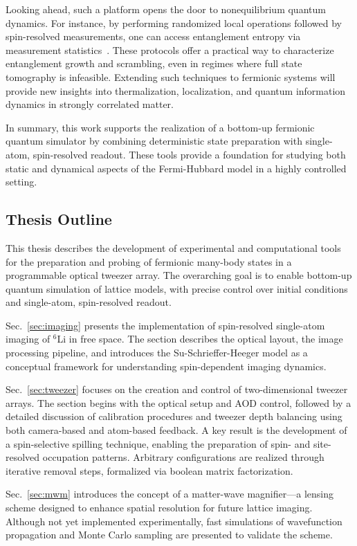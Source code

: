 Looking ahead, such a platform opens the door to nonequilibrium quantum dynamics. For instance, by performing randomized local operations followed by spin-resolved measurements, one can access entanglement entropy via measurement statistics~\cite{brydges_probing_2019}. These protocols offer a practical way to characterize entanglement growth and scrambling, even in regimes where full state tomography is infeasible. Extending such techniques to fermionic systems will provide new insights into thermalization, localization, and quantum information dynamics in strongly correlated matter.

In summary, this work supports the realization of a bottom-up fermionic quantum simulator by combining deterministic state preparation with single-atom, spin-resolved readout. These tools provide a foundation for studying both static and dynamical aspects of the Fermi-Hubbard model in a highly controlled setting.


\subsection{Thesis Outline}

This thesis describes the development of experimental and computational tools for the preparation and probing of fermionic many-body states in a programmable optical tweezer array. The overarching goal is to enable bottom-up quantum simulation of lattice models, with precise control over initial conditions and single-atom, spin-resolved readout.

Sec.~\ref{sec:imaging} presents the implementation of spin-resolved single-atom imaging of $^6$Li in free space. The section describes the optical layout, the image processing pipeline, and introduces the Su-Schrieffer-Heeger model as a conceptual framework for understanding spin-dependent imaging dynamics.

Sec.~\ref{sec:tweezer} focuses on the creation and control of two-dimensional tweezer arrays. The section begins with the optical setup and AOD control, followed by a detailed discussion of calibration procedures and tweezer depth balancing using both camera-based and atom-based feedback. A key result is the development of a spin-selective spilling technique, enabling the preparation of spin- and site-resolved occupation patterns. Arbitrary configurations are realized through iterative removal steps, formalized via boolean matrix factorization.

Sec.~\ref{sec:mwm} introduces the concept of a matter-wave magnifier—a lensing scheme designed to enhance spatial resolution for future lattice imaging. Although not yet implemented experimentally, fast simulations of wavefunction propagation and Monte Carlo sampling are presented to validate the scheme.


